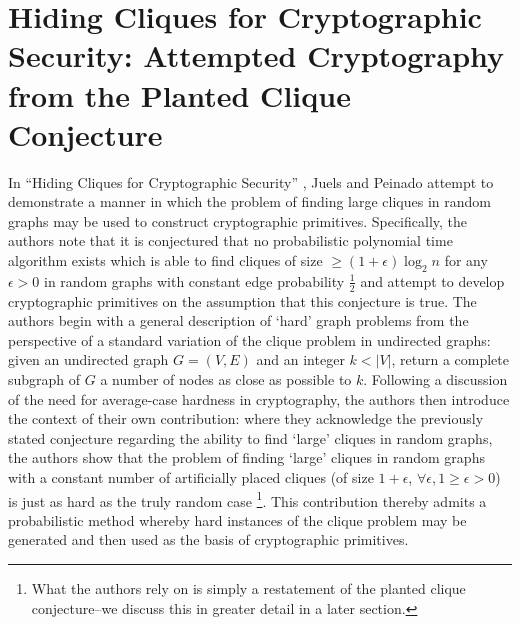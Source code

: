 \documentclass{article}
\theoremstyle{definition}
\begin{document}
\section{Hiding Cliques for Cryptographic Security: Attempted Cryptography from the Planted Clique
Conjecture}

In ``Hiding Cliques for Cryptographic Security'' \cite{HidingCliques}, Juels and Peinado 
attempt to demonstrate a manner in which the problem of finding large cliques in random graphs 
may be used to construct cryptographic primitives.  Specifically, the authors note that it is 
conjectured that no probabilistic polynomial time algorithm exists which is able to 
find cliques of size $\geq (1+\epsilon) \log_2{n}$ for any $\epsilon > 0$ in random graphs 
with constant edge probability $\frac{1}{2}$ and attempt to develop cryptographic primitives
on the assumption that this conjecture is true.
\newline\newline
The authors begin with a general description of `hard' graph problems from the perspective 
of a standard variation of the clique problem in undirected graphs: given an undirected graph 
$G=(V,E)$ and an integer $k < \lvert V \rvert$, return a complete subgraph of $G$ a number 
of nodes as close as possible to $k$.  Following a discussion of the need for 
average-case hardness in cryptography, the authors then introduce the context of their own
contribution: where they acknowledge the previously stated conjecture regarding the ability to find `large' cliques 
in random graphs, the authors show that the problem of finding `large' cliques 
in random graphs with a constant number of artificially placed cliques (of size 
$1+\epsilon$, $\forall \epsilon, 1 \geq \epsilon > 0$) is just as hard as the truly random case
\footnote{What the authors rely on is simply a restatement of the planted 
clique conjecture--we discuss this in greater detail in a later section.}.  This contribution 
thereby admits a probabilistic method whereby hard instances 
of the clique problem may be generated and then used as the basis of cryptographic primitives. 
\end{document}

